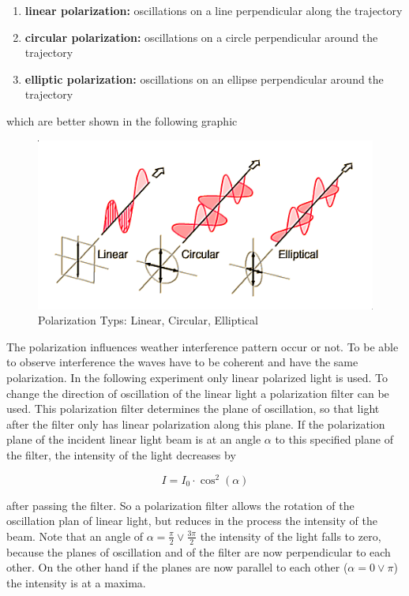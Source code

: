 \begin{enumerate}
	\item \textbf{linear polarization:} oscillations on a line perpendicular along the trajectory
	\item \textbf{circular polarization:} oscillations on a circle perpendicular around the trajectory
	\item \textbf{elliptic polarization:} oscillations on an ellipse perpendicular around the trajectory
\end{enumerate}

which are better shown in the following graphic

\begin{figure}[H]
	\centering
	\includegraphics[width=\textwidth]{Bilder/polarization.png}
	\caption{Polarization Typs: Linear, Circular, Elliptical \cite{book:skript}}\label{fig:po}
\end{figure}

The polarization influences weather interference pattern occur or not. To be
able to observe interference the waves have to be coherent and have the same
polarization. In the following experiment only linear polarized light is used. 
To change the direction of oscillation of the linear light a polarization filter can be used. 
This polarization filter determines the plane of oscillation, 
so that light after the filter only has linear polarization along this plane. 
If the polarization plane of the incident linear light beam is at an angle $\alpha $ to this specified plane of the filter,
the intensity of the light decreases by

\begin{equation}
	I=I_0 \cdot \cos^2(\alpha )
	\label{eq:pol}
\end{equation}

after passing the filter.
So a polarization filter allows the rotation of the oscillation plan of linear light, but reduces in the process the intensity of the beam. 
Note that an angle of $\alpha=\frac{\pi}{2} \vee \frac{3\pi}{2}  $ the intensity of the light falls to zero, 
because the planes of oscillation and of the filter are now perpendicular to each other.
On the other hand if the planes are now parallel to each other ($\alpha=0 \vee \pi$) the intensity is at a maxima. 

